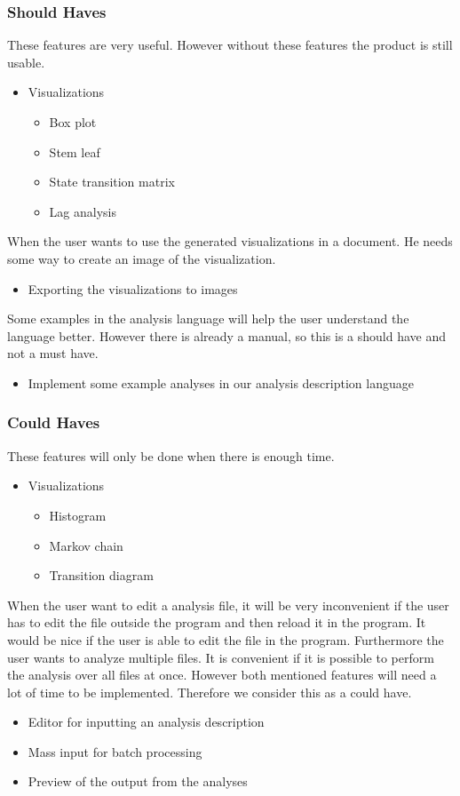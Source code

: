 \subsubsection{Should Haves}
These features are very useful. However without these features the product is still usable.
\begin{itemize}
	\item Visualizations
    \begin{itemize}
    	\item Box plot
        \item Stem leaf
        \item State transition matrix
        \item Lag analysis
    \end{itemize}
 \end{itemize}
   When the user wants to use the generated visualizations in a document. He needs some way to create an image of the visualization.
 \begin{itemize}
	\item Exporting the visualizations to images
\end{itemize}
Some examples in the analysis language will help the user understand the language better. However there is already a manual, so this is a should have and not a must have.
\begin{itemize}
    \item Implement some example analyses in our analysis description language
\end{itemize}

\subsubsection{Could Haves}
These features will only be done when there is enough time.
 \begin{itemize}
  \item Visualizations
  \begin{itemize}
	  \item Histogram
      \item Markov chain
      \item Transition diagram
  \end{itemize}
\end{itemize}
When the user want to edit a analysis file, it will be very inconvenient if the user has to edit the file outside the program and then reload it in the program. It would be nice if the user is able to edit the file in the program. Furthermore the user wants to analyze multiple files. It is convenient if it is possible to perform the analysis over all files at once. However both mentioned features will need a lot of time to be implemented. Therefore we consider this as a could have.
\begin{itemize}
  \item Editor for inputting an analysis description 
  \item Mass input for batch processing 
  \item Preview of the output from the analyses
\end{itemize}


